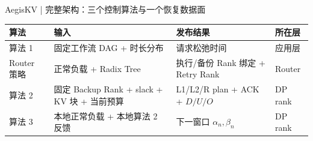 \begin{frame}{AegisKV | 完整架构：三个控制算法与一个恢复数据面}
  \vspace{0.14cm}
  \scriptsize
  \renewcommand{\arraystretch}{1.12}
  \begin{tabularx}{\textwidth}{p{}p{}p{}X}
    \toprule
    算法 & 输入 & 发布结果 & 所在层 \\
    \midrule
    算法 1 & 固定工作流 DAG + 时长分布 & 请求松弛时间 & 应用层 \\
    Router 策略 & 正常负载 + Radix Tree & 执行/备份 Rank 绑定 + Retry Rank & Router \\
    算法 2 & 固定 Backup Rank + slack + KV 块 + 当前预算 & L1/L2/R plan + ACK + $D/U/O$ & DP rank \\
    算法 3 & 本地正常负载 + 本地算法 2 反馈 & 下一窗口 $\alpha_n,\beta_n$ & DP rank \\
    \bottomrule
  \end{tabularx}
\end{frame}

